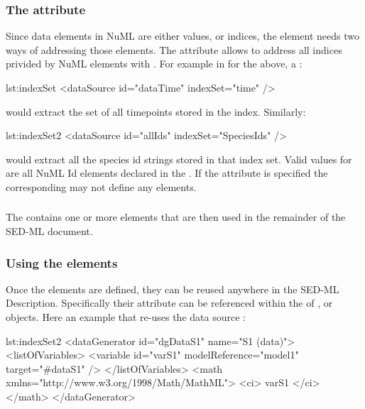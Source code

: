 \subsubsection{The  attribute}
\label{sec:indexSet}
Since data elements in NuML are either values, or indices, the \SedDataSource element needs two ways of addressing those elements. The  attribute allows to address all indices privided by NuML elements with . For example in for the   above, a :

\begin{myXmlLst}{}{lst:indexSet}
        <dataSource id="dataTime" indexSet="time" />
\end{myXmlLst} 

would extract the set of all timepoints stored in the index. Similarly: 

\begin{myXmlLst}{}{lst:indexSet2}
        <dataSource id="allIds" indexSet="SpeciesIds" />
\end{myXmlLst} 

would extract all the species id strings stored in that index set. Valid values for  are all NuML Id elements declared in the . If the  attribute is specified the corresponding  may not define any  elements.


\subsubsection{}
\label{class:listOfSlices}
The  contains one or more \SedSlice elements that are then used in the remainder of the SED-ML document.


\subsubsection{Using the  elements}
Once the \SedDataSource elements are defined, they can be reused anywhere in the SED-ML Description. Specifically their  attribute can be referenced within the  of ,  or  objects. Here an example that re-uses the data source :

\begin{myXmlLst}{}{lst:indexSet2}
   <dataGenerator id="dgDataS1" name="S1 (data)">
     <listOfVariables>
       <variable id="varS1" modelReference="model1" target="#dataS1" />
     </listOfVariables>
     <math xmlns="http://www.w3.org/1998/Math/MathML">
       <ci> varS1 </ci>
     </math>
   </dataGenerator>
\end{myXmlLst} 

